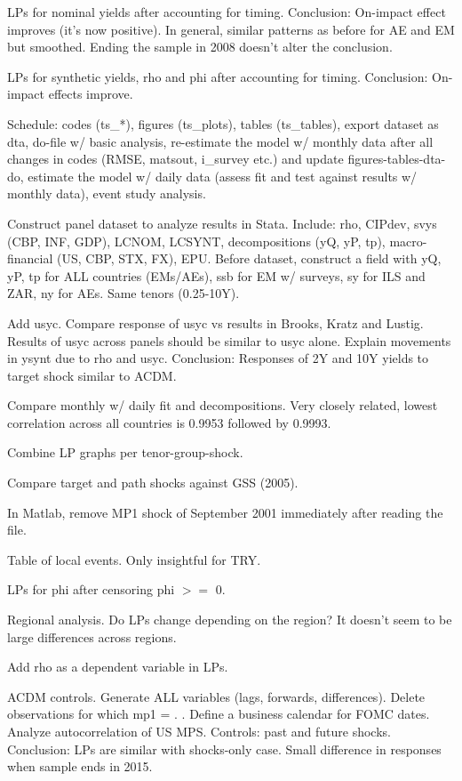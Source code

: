 \documentclass[12pt]{article}
\newcommand{\cmark}{\ding{51}}
\newcommand{\done}{\rlap{$\square$}{\raisebox{2pt}{\large\hspace{1pt}\cmark}}%
	\hspace{-2.5pt}}
\begin{document}
\begin{todolist}
	\item[\done] LPs for nominal yields after accounting for timing. Conclusion: On-impact effect improves (it's now positive). In general, similar patterns as before for AE and EM but smoothed. Ending the sample in 2008 doesn't alter the conclusion.
	\item[\done] LPs for synthetic yields, rho and phi after accounting for timing. Conclusion: On-impact effects improve.
	\item[\done] Schedule: codes (ts_*), figures (ts_plots), tables (ts_tables), export dataset as dta, do-file w/ basic analysis, re-estimate the model w/ monthly data after all changes in codes (RMSE, matsout, i_survey etc.) and update figures-tables-dta-do, estimate the model w/ daily data (assess fit and test against results w/ monthly data), event study analysis.
	\item[\done] Construct panel dataset to analyze results in Stata. Include: rho, CIPdev, svys (CBP, INF, GDP), LCNOM, LCSYNT, decompositions (yQ, yP, tp), macro-financial (US, CBP, STX, FX), EPU. Before dataset, construct a field with yQ, yP, tp for ALL countries (EMs/AEs), ssb for EM w/ surveys, sy for ILS and ZAR, ny for AEs. Same tenors (0.25-10Y).
	\item[\done] Add usyc. Compare response of usyc vs results in Brooks, Kratz and Lustig. Results of usyc across panels should be similar to usyc alone. Explain movements in ysynt due to rho and usyc. Conclusion: Responses of 2Y and 10Y yields to target shock similar to ACDM.
	\item Compare monthly w/ daily fit and decompositions. Very closely related, lowest correlation across all countries is 0.9953 followed by 0.9993.
	\item[\done] Combine LP graphs per tenor-group-shock.
	\item[\done] Compare target and path shocks against GSS (2005).
	\item[\done] In Matlab, remove MP1 shock of September 2001 immediately after reading the file.
	\item[\done] Table of local events. Only insightful for TRY.
	\item[\done] LPs for phi after censoring phi \(>=\) 0.
	\item Regional analysis. Do LPs change depending on the region? It doesn't seem to be large differences across regions.
	\item[\done] Add rho as a dependent variable in LPs.
	\item[\done] ACDM controls. Generate ALL variables (lags, forwards, differences). Delete observations for which mp1 = . . Define a business calendar for FOMC dates. Analyze autocorrelation of US MPS. Controls: past and future shocks. Conclusion: LPs are similar with shocks-only case. Small difference in responses when sample ends in 2015.

\end{todolist}
\end{document}
